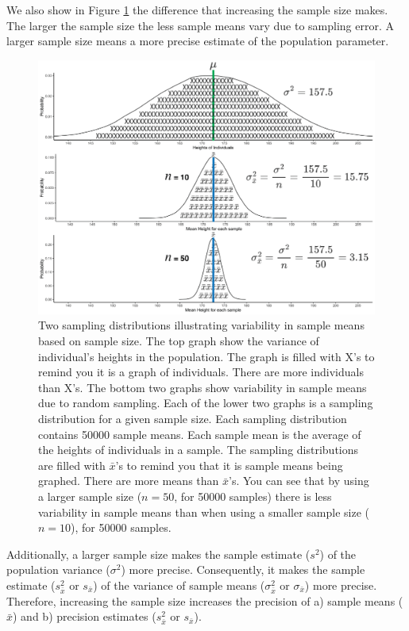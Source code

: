 \documentclass[
]{krantz}
\begin{document}
We also show in Figure \ref{fig:threedist} the difference that increasing the sample size makes. The larger the sample size the less sample means vary due to sampling error. A larger sample size means a more precise estimate of the population parameter.

\begin{figure}
\includegraphics[width=0.8\linewidth]{ch_samples_precision/images/sampling_mdist} \caption[Two sampling distributions illustrating variability in sample means based on sample size]{Two sampling distributions illustrating variability in sample means based on sample size. The top graph show the variance of individual's heights in the population. The graph is filled with X's to remind you it is a graph of individuals. There are more individuals than X's. The bottom two graphs show variability in sample means due to random sampling. Each of the lower two graphs is a sampling distribution for a given sample size. Each sampling distribution contains 50000 sample means. Each sample mean is the average of the heights of individuals in a sample. The sampling distributions are filled with $\bar{x}$'s to remind you that it is sample means being graphed. There are more means than $\bar{x}$'s. You can see that by using a larger sample size ($n = 50$, for 50000 samples) there is less variability in sample means than when using a smaller sample size ($n = 10$), for 50000 samples.}\label{fig:threedist}
\end{figure}

Additionally, a larger sample size makes the sample estimate (\(s^2\)) of the population variance (\(\sigma^2\)) more precise. Consequently, it makes the sample estimate (\(s_{\bar{x}}^2\) or \(s_{\bar{x}}\)) of the variance of sample means (\(\sigma_{\bar{x}}^2\) or \(\sigma_{\bar{x}}\)) more precise. Therefore, increasing the sample size increases the precision of a) sample means (\(\bar{x}\)) and b) precision estimates (\(s_{\bar{x}}^2\) or \(s_{\bar{x}}\)).
\end{document}
